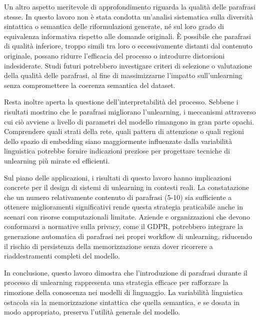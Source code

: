 Un altro aspetto meritevole di approfondimento riguarda la qualità delle parafrasi stesse. In questo lavoro non è stata condotta un'analisi sistematica sulla diversità sintattica o semantica delle riformulazioni generate, né sul loro grado di equivalenza informativa rispetto alle domande originali. È possibile che parafrasi di qualità inferiore, troppo simili tra loro o eccessivamente distanti dal contenuto originale, possano ridurre l'efficacia del processo o introdurre distorsioni indesiderate. Studi futuri potrebbero investigare criteri di selezione o valutazione della qualità delle parafrasi, al fine di massimizzarne l'impatto sull'unlearning senza compromettere la coerenza semantica del dataset.

Resta inoltre aperta la questione dell'interpretabilità del processo. Sebbene i risultati mostrino che le parafrasi migliorano l'unlearning, i meccanismi attraverso cui ciò avviene a livello di parametri del modello rimangono in gran parte opachi. Comprendere quali strati della rete, quali pattern di attenzione o quali regioni dello spazio di embedding siano maggiormente influenzate dalla variabilità linguistica potrebbe fornire indicazioni preziose per progettare tecniche di unlearning più mirate ed efficienti.

Sul piano delle applicazioni, i risultati di questo lavoro hanno implicazioni concrete per il design di sistemi di unlearning in contesti reali. La constatazione che un numero relativamente contenuto di parafrasi (5-10) sia sufficiente a ottenere miglioramenti significativi rende questa strategia praticabile anche in scenari con risorse computazionali limitate. Aziende e organizzazioni che devono conformarsi a normative sulla privacy, come il GDPR, potrebbero integrare la generazione automatica di parafrasi nei propri workflow di unlearning, riducendo il rischio di persistenza della memorizzazione senza dover ricorrere a riaddestramenti completi del modello.

In conclusione, questo lavoro dimostra che l'introduzione di parafrasi durante il processo di unlearning rappresenta una strategia efficace per rafforzare la rimozione della conoscenza nei modelli di linguaggio. La variabilità linguistica ostacola sia la memorizzazione sintattica che quella semantica, e se dosata in modo appropriato, preserva l'utilità generale del modello.
